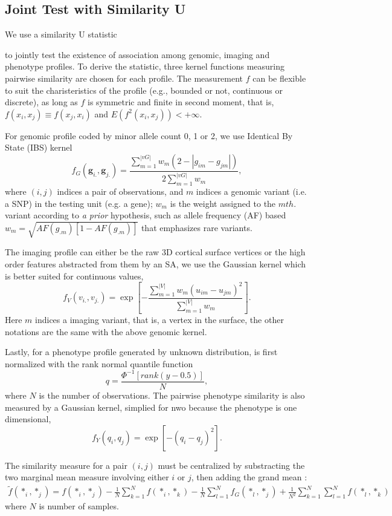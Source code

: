 \subsection{Joint Test with Similarity U}
We use a similarity U statistic {\cite{UST1, UST2} to jointly test the existence of association among genomic, imaging and phenotype profiles. To derive the statistic, three kernel functions measuring pairwise similarity are chosen for each profile. The measurement $f$ can be flexible to suit the charisteristics of the profile (e.g., bounded or not, continuous or discrete), as long as $f$ is symmetric and finite in second moment, that is, $f(x_i,x_j) \equiv f(x_j,x_i)$ and $E(f^2(x_i, x_j))<+\infty$.
\newcommand{\vg}{\boldsymbol{g}}
\newcommand{\vv}{\boldsymbol{v}}
\newcommand{\vy}{\boldsymbol{y}}
\newcommand{\vG}{\boldsymbol{G}}
\newcommand{\vV}{\boldsymbol{V}}
\newcommand{\vY}{\boldsymbol{Y}}
\newcommand{\vq}{\boldsymbol{q}}

For genomic profile coded by minor allele count 0, 1 or 2, we use Identical By State (IBS) kernel
\label{eq:wSG}
\[ f_G(\vg_{i.}, \vg_{j.}) = \frac{\sum_{m=1}^{|vG|}{w_m(2 - |g_{im} - g_{jm}|)}} {2\sum_{m=1}^{|vG|}{w_m}}, \]
where $(i,j)$ indices a pair of observations, and $m$ indices a genomic variant (i.e. a SNP) in the testing unit (e.g. a gene); $w_m$ is the weight assigned to the $m th.$ variant according to \textit{a prior} hypothesis, such as allele frequency (AF) based $w_m=\sqrt{AF(g_{.m})[1-AF(g_{.m})]}$ that emphasizes rare variants.

The imaging profile can either be the raw 3D cortical surface vertices or the high order features abstracted from them by an SA, we use the Gaussian kernel which is better suited for continuous values,
\label{eq:wSV}
\[ f_V(v_{i.},v_{j.}) = \exp{ [-\frac{\sum_{m=1}^{|V|}{w_m(u_{im}-u_{jm})^2}} {\sum_{m=1}^{|V|}{w_m}}] }. \]
Here $m$ indices a imaging variant, that is, a vertex in the surface, the other notations are the same with the above genomic kernel.

Lastly, for a phenotype profile generated by unknown distribution, is first normalized with the rank normal quantile function
\[ q = \frac{\Phi^{-1}[rank(y - 0.5)]}{N}, \]
where $N$ is the number of observations. The pairwise phenotype similarity is also measured by a Gaussian kernel, simplied for nwo because the phenotype is one dimensional,
\[ f_Y(q_i, q_j) = \exp{[-(q_i - q_j)^2]}. \]

The similarity measure for a pair $(i, j)$ must be centralized by substracting the two marginal mean measure involving either $i$ or $j$, then adding the grand mean \cite{UST1}:
\begin{align*}
  \tilde{f}(*_i, *_j) = f(*_i, *_j)-\frac{1}{N} \sum_{k=1}^N{f(*_i, *_k)}-\frac{1}{N}\sum_{l=1}^N{f_G(*_l, *_j)} + \frac{1}{N^2} \sum_{k=1}^{N} \sum_{l=1}^{N} {f(*_l, *_k)}
\end{align*}
where $N$ is number of samples. 

}
